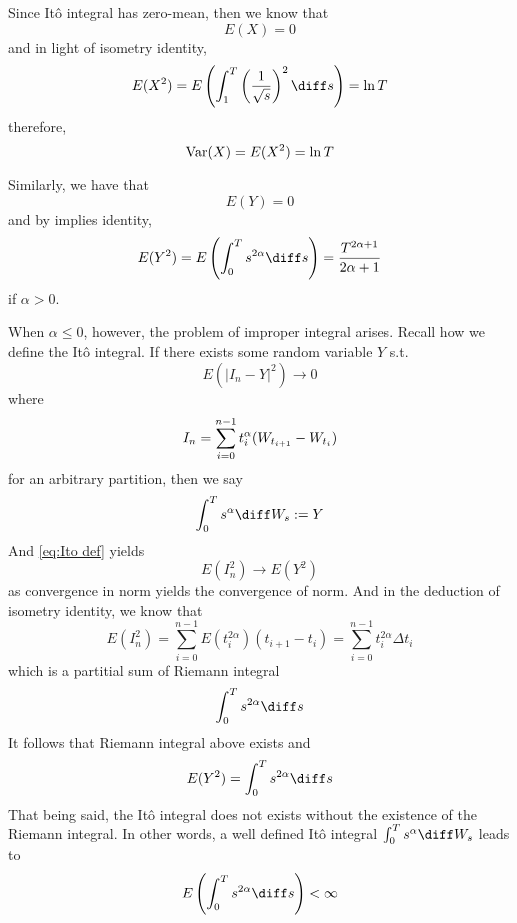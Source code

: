     \problem
    \begin{subproblem}[(\arabic*).]
        \item
        Since It\^o integral has zero-mean, then
        we know that
        \[E(X)=0\]
        and in light of isometry identity,
        \[E(X^2)=E\left(\int_1^T\left(\frac{1}{\sqrt s}\right)^2
        \diff s\right)=\ln T\]
        therefore,
        \[\mathrm{Var}(X)=E(X^2)=\ln T\]

        \item
        Similarly, we have that
        \[E(Y)=0\]
        and by implies identity,
        \[E(Y^2)=E\left(\int_0^Ts^{2\alpha}\diff s\right)
        =\frac{T^{2\alpha+1}}{2\alpha+1}\]
        if $\alpha>0$.

        When $\alpha\leq 0$, however,
        the problem of improper integral arises.
        Recall how we define the It\^o integral.
        If there exists some random variable $Y$ s.t.
        \begin{equation}
            \label{eq:Ito def}
            E(|I_n-Y|^2)\to 0
        \end{equation}
        where
        \[I_n=\sum_{i=0}^{n-1}t_i^\alpha(W_{t_{i+1}}-W_{t_i})\]
        for an arbitrary partition,
        then we say
        \[\int_0^Ts^\alpha\diff W_s:=Y\]
        And \cref{eq:Ito def} yields
        \[E(I_n^2)\to E(Y^2)\]
        as convergence in norm yields the convergence of norm.
        And in the deduction of isometry identity, we know that
        \[E(I_n^2)=\sum_{i=0}^{n-1}E(t_i^{2\alpha})(t_{i+1}-t_i)
        =\sum_{i=0}^{n-1}t_i^{2\alpha}\Delta t_i\]
        which is a partitial sum of Riemann integral
        \begin{equation}
            \label{eq:Riemann int}
            \int_0^Ts^{2\alpha}\diff s
        \end{equation}
        It follows that Riemann integral above exists
        and
        \[E(Y^2)=\int_0^Ts^{2\alpha}\diff s\]
        That being said, the It\^o integral does not exists
        without the existence of the Riemann integral.
        In other words, a well defined It\^o integral
        $\int_0^Ts^\alpha\diff W_s$
        leads to
        \[E\left(\int_0^Ts^{2\alpha}\diff s\right)<\infty\]


\end{subproblem}
